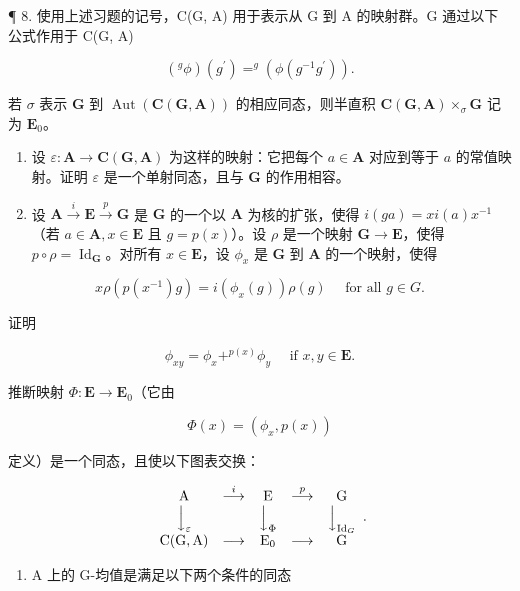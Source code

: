 ¶ 8. 使用上述习题的记号，C(G, A) 用于表示从 G 到 A 的映射群。G 通过以下公式作用于 C(G, A)

\[
\left(^ {g} \phi\right) \left(g ^ {\prime}\right) = ^ {g} \left(\phi \left(g ^ {- 1} g ^ {\prime}\right)\right).
\]

若 \(\sigma\) 表示 \(\mathbf{G}\) 到 \(\operatorname{Aut}(\mathbf{C}(\mathbf{G},\mathbf{A}))\) 的相应同态，则半直积 \(\mathbf{C}(\mathbf{G},\mathbf{A}) \times_{\sigma} \mathbf{G}\) 记为 \(\mathbf{E}_0\)。

\begin{enumerate}
\def\labelenumi{(\alph{enumi})}
\item
  设 \(\varepsilon: \mathbf{A} \to \mathbf{C}(\mathbf{G}, \mathbf{A})\) 为这样的映射：它把每个 \(a \in \mathbf{A}\) 对应到等于 \(a\) 的常值映射。证明 \(\varepsilon\) 是一个单射同态，且与 \(\mathbf{G}\) 的作用相容。
\item
  设 \(\mathbf{A} \xrightarrow{i} \mathbf{E} \xrightarrow{p} \mathbf{G}\) 是 \(\mathbf{G}\) 的一个以 \(\mathbf{A}\) 为核的扩张，使得 \(i(ga) = xi(a)x^{-1}\)（若 \(a \in \mathbf{A}, x \in \mathbf{E}\) 且 \(g = p(x)\)）。设 \(\rho\) 是一个映射 \(\mathbf{G} \to \mathbf{E}\)，使得 \(p \circ \rho = \operatorname{Id}_{\mathbf{G}}\)。对所有 \(x \in \mathbf{E}\)，设 \(\phi_x\) 是 \(\mathbf{G}\) 到 \(\mathbf{A}\) 的一个映射，使得
\end{enumerate}

\[
x \rho (p (x ^ {- 1}) g) = i (\phi_ {x} (g)) \rho (g) \quad \text { for   all } g \in G.
\]

证明

\[
\phi_ {x y} = \phi_ {x} + ^ {p (x)} \phi_ {y} \quad \text { if } x, y \in \mathbf {E}.
\]

推断映射 \(\Phi: \mathbf{E} \to \mathbf{E}_0\)（它由

\[
\Phi (x) = (\phi_ {x}, p (x))
\]

定义）是一个同态，且使以下图表交换：

\[
\begin{array}{c c c c c} \mathrm{A} & \stackrel {{i}} {{\longrightarrow}} & \mathrm{E} & \stackrel {{p}} {{\longrightarrow}} & \mathrm{G} \\ \Big \downarrow_ {\varepsilon} & & \Big \downarrow_ {\Phi} & & \Big \downarrow_ {\mathrm{Id} _ {G}} \\ \mathrm{C(G,A)} & \longrightarrow & \mathrm{E} _ {0} & \longrightarrow & \mathrm{G} \end{array} .
\]

\begin{enumerate}
\def\labelenumi{(\alph{enumi})}
\setcounter{enumi}{2}
\tightlist
\item
  A 上的 G-均值是满足以下两个条件的同态
\end{enumerate}

